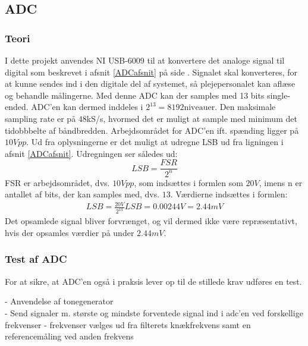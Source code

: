 \subsection{ADC}

\subsubsection{Teori}
I dette projekt anvendes NI USB-6009 til at konvertere det analoge signal til digital som beskrevet i afsnit \ref{ADCafsnit} på side \pageref{ADCafsnit}. Signalet skal konverteres, for at kunne sendes ind i den digitale del af systemet, så plejepersonalet kan aflæse og behandle målingerne. Med denne ADC kan der samples med 13 bits single-ended. ADC'en kan dermed inddeles i $2^{13} = 8192 \text{niveauer}$. Den maksimale sampling rate er på $48$kS/s, hvormed det er muligt at sample med minimum det tidobbbelte af båndbredden. Arbejdsområdet for ADC'en ift. spænding ligger på $10Vpp$. \cite{Instruments2014} Ud fra oplysningerne er det muligt at udregne LSB ud fra ligningen i afsnit \ref{ADCafsnit}. Udregningen ser således ud: \\
\begin{equation}
	LSB = \frac{FSR}{2^{n}} 
\end{equation}  
FSR er arbejdsområdet, dvs. $10Vpp$, som indsættes i formlen som $20V$, imens n er antallet af bits, der kan samples med, dvs. $13$.
Værdierne indsættes i formlen: \\
\begin{align}
	LSB = \frac{20V}{2^{13}}
	LSB = 0.00244V = 2.44mV
\end{align}
Det opsamlede signal bliver forvrænget, og vil dermed ikke være repræsentativt, hvis der opsamles værdier på under $2.44mV$. 

\subsubsection{Test af ADC}
For at sikre, at ADC'en også i praksis lever op til de stillede krav udføres en test.

\noindent - Anvendelse af tonegenerator \\
- Send signaler m. største og mindste forventede signal ind i adc'en ved forskellige frekvenser - frekvenser vælges ud fra filterets knækfrekvens samt en referencemåling ved anden frekvens